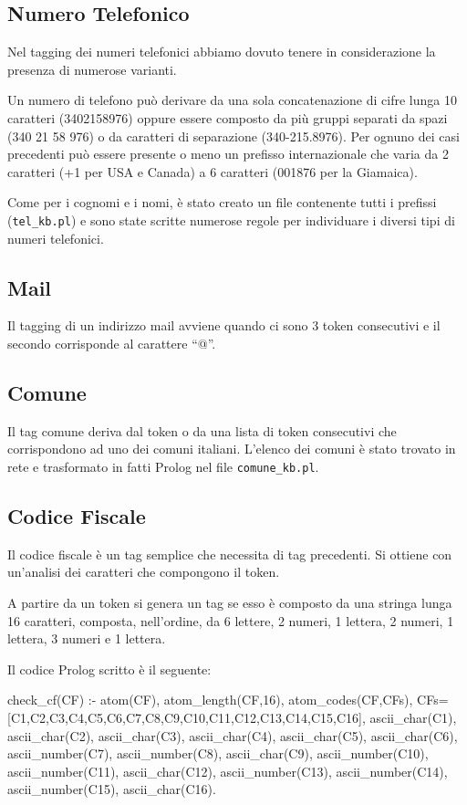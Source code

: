\subsection{Numero Telefonico}
Nel tagging dei numeri telefonici abbiamo dovuto tenere in considerazione la presenza di numerose varianti.

Un numero di telefono può derivare da una sola concatenazione di cifre lunga 10 caratteri (3402158976) oppure essere composto da più gruppi separati da spazi (340 21 58 976) o da caratteri di separazione (340-215.8976). Per ognuno dei casi precedenti può essere presente o meno un prefisso internazionale che varia da 2 caratteri (+1 per USA e Canada) a 6 caratteri (001876 per la Giamaica).

Come per i cognomi e i nomi, è stato creato un file contenente tutti i prefissi (\verb|tel_kb.pl|) e sono state scritte numerose regole per individuare i diversi tipi di numeri telefonici.

\subsection{Mail}
Il tagging di un indirizzo mail avviene quando ci sono 3 token consecutivi e il secondo corrisponde al carattere ``@''.

\subsection{Comune}
Il tag comune deriva dal token o da una lista di token consecutivi che corrispondono ad uno dei comuni italiani. L'elenco dei comuni è stato trovato in rete e trasformato in fatti Prolog nel file \verb|comune_kb.pl|.

\subsection{Codice Fiscale}
Il codice fiscale è un tag semplice che necessita di tag precedenti. Si ottiene con un'analisi dei caratteri che compongono il token.

A partire da un token si genera un tag  se esso è composto da una stringa lunga 16 caratteri, composta, nell'ordine, da 6 lettere, 2 numeri, 1 lettera, 2 numeri, 1 lettera, 3 numeri e 1 lettera.

Il codice Prolog scritto è il seguente:

\begin{prologcode}
check_cf(CF) :-
  atom(CF),
  atom_length(CF,16),
  atom_codes(CF,CFs),
  CFs=[C1,C2,C3,C4,C5,C6,C7,C8,C9,C10,C11,C12,C13,C14,C15,C16],
  ascii_char(C1),
  ascii_char(C2),
  ascii_char(C3),
  ascii_char(C4),
  ascii_char(C5),
  ascii_char(C6),
  ascii_number(C7),
  ascii_number(C8),
  ascii_char(C9),
  ascii_number(C10),
  ascii_number(C11),
  ascii_char(C12),
  ascii_number(C13),
  ascii_number(C14),
  ascii_number(C15),
  ascii_char(C16).
\end{prologcode}